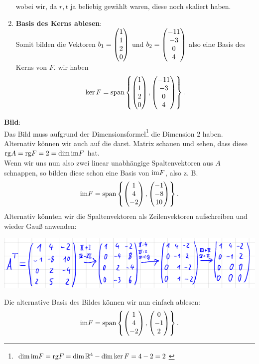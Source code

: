 \begin{Beispiel}[label=beisp:basisbildkern]
\begin{enumerate}
\begin{equation*}
    \end{equation*}
    wobei wir, da $r,t$ ja beliebig gewählt waren, diese noch skaliert haben.
    \item \textbf{Basis des Kerns ablesen}:\\
    Somit bilden die Vektoren $b_1=\begin{pmatrix}1\\1\\2\\0\end{pmatrix}$ und $b_2=\begin{pmatrix}-11\\-3\\0\\4\end{pmatrix}$ also eine Basis des Kerns von $F$. wir haben
    \begin{equation*}
        \ker F=\text{span}\left\{\begin{pmatrix}1\\1\\2\\0\end{pmatrix},\begin{pmatrix}-11\\-3\\0\\4\end{pmatrix}\right\}.
    \end{equation*}
\end{enumerate}
\textbf{Bild}:\\
Das Bild muss aufgrund der Dimensionsformel\footnote{$\dim\text{im} F=\text{rg} F=\dim\mathbb{R}^4-\dim\ker F=4-2=2$} die Dimension 2 haben.\\
Alternativ können wir auch auf die darst. Matrix schauen und sehen, dass diese $\text{rg} A=\text{rg} F=2=\dim\text{im} F$ hat.\\
Wenn wir uns nun also zwei linear unabhängige Spaltenvektoren aus $A$ schnappen, so bilden diese schon eine Basis von $\text{im} F$, also z. B.
\begin{equation*}
    \text{im} F=\text{span}\left\{\begin{pmatrix}1\\4\\-2\end{pmatrix},\begin{pmatrix}-1\\-8\\10\end{pmatrix}\right\}.
\end{equation*}
Alternativ könnten wir die Spaltenvektoren als Zeilenvektoren aufschreiben und wieder Gauß anwenden:
\begin{center}
    \includegraphics[width=.5\textwidth]{Dateien/00/12BildGauss.PNG}
\end{center}
Die alternative Basis des Bildes können wir nun einfach ablesen:
\begin{equation*}
    \text{im} F=\text{span}\left\{\begin{pmatrix}1\\4\\-2\end{pmatrix},\begin{pmatrix}0\\-1\\2\end{pmatrix}\right\}.
\end{equation*}
\end{Beispiel}
